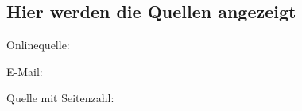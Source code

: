 \subsection{Hier werden die Quellen angezeigt}

Onlinequelle: 

E-Mail: 

Quelle mit Seitenzahl: \cite[S. 2 f.]{Vaughan2016}

